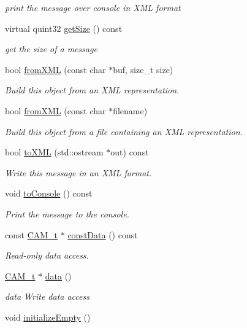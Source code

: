\begin{DoxyCompactItemize}
\begin{DoxyCompactList}\small\item\em print the message over console in X\+ML format \end{DoxyCompactList}\item 
virtual quint32 \hyperlink{classCAMMessage_ace1b6d647755a20130e692565882ce68}{get\+Size} () const 
\begin{DoxyCompactList}\small\item\em get the size of a message \end{DoxyCompactList}\item 
bool \hyperlink{classCAMMessage_a71ab26737e4f5163bae6d0f14c18eb5c}{from\+X\+ML} (const char $\ast$buf, size\+\_\+t size)
\begin{DoxyCompactList}\small\item\em Build this object from an X\+ML representation. \end{DoxyCompactList}\item 
bool \hyperlink{classCAMMessage_a99fd5af2f59521832d50b2191aee405a}{from\+X\+ML} (const char $\ast$filename)
\begin{DoxyCompactList}\small\item\em Build this object from a file containing an X\+ML representation. \end{DoxyCompactList}\item 
bool \hyperlink{classCAMMessage_abc5174be6c558073d15dd0f1bb395099}{to\+X\+ML} (std\+::ostream $\ast$out) const 
\begin{DoxyCompactList}\small\item\em Write this message in an X\+ML format. \end{DoxyCompactList}\item 
void \hyperlink{classCAMMessage_ade4591ace41f3dd40f65e7c34cd82cab}{to\+Console} () const \hypertarget{classCAMMessage_ade4591ace41f3dd40f65e7c34cd82cab}{}\label{classCAMMessage_ade4591ace41f3dd40f65e7c34cd82cab}

\begin{DoxyCompactList}\small\item\em Print the message to the console. \end{DoxyCompactList}\item 
const \hyperlink{structCAM}{C\+A\+M\+\_\+t} $\ast$ \hyperlink{classCAMMessage_abe838f3849dddd612f257d073ed0ceab}{const\+Data} () const 
\begin{DoxyCompactList}\small\item\em Read-\/only data access. \end{DoxyCompactList}\item 
\hyperlink{structCAM}{C\+A\+M\+\_\+t} $\ast$ \hyperlink{classCAMMessage_af92e259fc9a18a36a16ed692c1546f47}{data} ()
\begin{DoxyCompactList}\small\item\em data Write data access \end{DoxyCompactList}\item 
void \hyperlink{classCAMMessage_abd793880c42373a626d9032187d1facf}{initialize\+Empty} ()\hypertarget{classCAMMessage_abd793880c42373a626d9032187d1facf}{}\label{classCAMMessage_abd793880c42373a626d9032187d1facf}


\end{DoxyCompactItemize}
